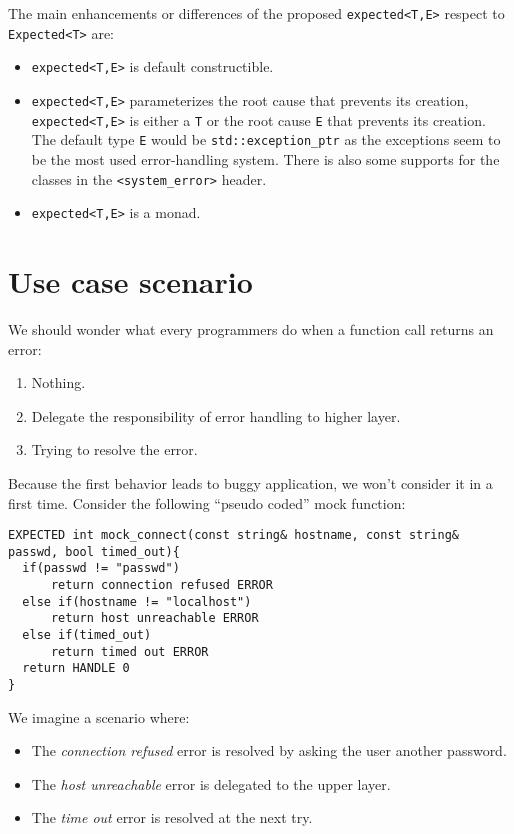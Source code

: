 \documentclass[a4paper,10pt]{article}
\newcommand{\cpp}[1]{\lstinline{#1}}
\begin{document}
\noindent
The main enhancements or differences of the proposed \cpp{expected<T,E>} respect to \cpp{Expected<T>} are:
\begin{itemize}
 \item \cpp{expected<T,E>} is default constructible.
 \item \cpp{expected<T,E>} parameterizes the root cause that prevents its creation, \cpp{expected<T,E>} is either a \cpp{T} or the root cause \cpp{E} that prevents its creation. The default type \cpp{E} would be \cpp{std::exception_ptr} as the exceptions seem to be the most used error-handling system. There is also some supports for the classes in the \cpp{<system_error>} header.
 \item \cpp{expected<T,E>} is a monad.
\end{itemize}

\section{Use case scenario}

We should wonder what every programmers do when a function call returns an error:

\begin{enumerate}
 \item Nothing.
 \item Delegate the responsibility of error handling to higher layer.
 \item Trying to resolve the error.
\end{enumerate}

Because the first behavior leads to buggy application, we won't consider it in a first time. Consider the following ``pseudo coded'' mock function:

\begin{lstlisting}
EXPECTED int mock_connect(const string& hostname, const string& passwd, bool timed_out){
  if(passwd != "passwd")
      return connection refused ERROR
  else if(hostname != "localhost")
      return host unreachable ERROR
  else if(timed_out)
      return timed out ERROR
  return HANDLE 0
}
\end{lstlisting}

We imagine a scenario where:

\begin{itemize}
 \item The \textit{connection refused} error is resolved by asking the user another password.
 \item The \textit{host unreachable} error is delegated to the upper layer.
 \item The \textit{time out} error is resolved at the next try.
\end{itemize}
\end{document}
